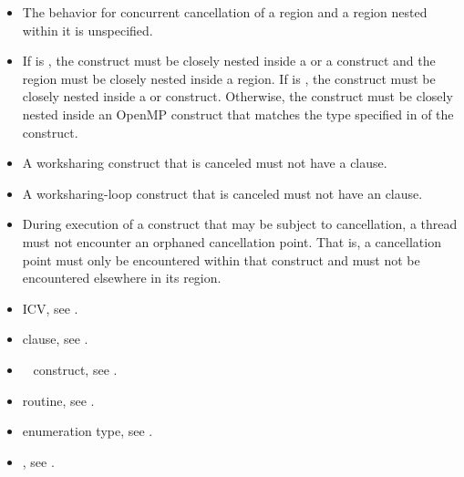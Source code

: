 \begin{itemize}
\item The behavior for concurrent cancellation of a region and a region nested 
      within it is unspecified.
\item If  is , the 
      construct must be closely nested inside a  or a  construct and the
       region must be closely nested inside a  
      region. If  is , the 
       construct must be closely nested inside a  
      or  construct. Otherwise, the  construct must 
      be closely nested inside an OpenMP construct that matches the type 
      specified in  of the  construct.
\item A worksharing construct that is canceled must not have a  clause.
\item A worksharing-loop construct that is canceled must not have an 
       clause.
\item During execution of a construct that may be subject to cancellation, a
      thread must not encounter an orphaned cancellation point. That is, a
      cancellation point must only be encountered within that construct and must
      not be encountered elsewhere in its region.
\end{itemize}

\crossreferences
\begin{itemize}
\item {} ICV, see
.

\item {} clause, see .

\item {}~ construct, see
.

\item {} routine, see
.

\item {} enumeration type, see .

\item {}, see .
\end{itemize}



